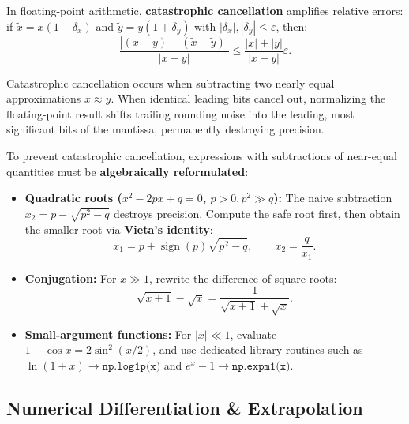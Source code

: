 \begin{theorem}
    In floating-point arithmetic, \textbf{catastrophic cancellation} amplifies relative errors: if $\tilde{x} = x(1 + \delta_x)$ and $\tilde{y} = y(1 + \delta_y)$ with $|\delta_x|, |\delta_y| \le \varepsilon$, then:
    \begin{equation}
        \frac{|(x - y) - (\tilde{x} - \tilde{y})|}{|x - y|} \le \frac{|x| + |y|}{|x - y|} \varepsilon.
    \end{equation}
\end{theorem}

Catastrophic cancellation occurs when subtracting two nearly equal approximations $x \approx y$. When identical leading bits cancel out, normalizing the floating-point result shifts trailing rounding noise into the leading, most significant bits of the mantissa, permanently destroying precision.

\begin{important}
    To prevent catastrophic cancellation, expressions with subtractions of near-equal quantities must be \textbf{algebraically reformulated}:
    \begin{itemize}
        \item \textbf{Quadratic roots ($x^2 - 2px + q = 0$, $p > 0, p^2 \gg q$):} The naive subtraction $x_2 = p - \sqrt{p^2 - q}$ destroys precision. Compute the safe root first, then obtain the smaller root via \textbf{Vieta's identity}:
        \begin{equation}
            x_1 = p + \operatorname{sign}(p)\sqrt{p^2 - q}, \qquad x_2 = \frac{q}{x_1}.
        \end{equation}
        \item \textbf{Conjugation:} For $x \gg 1$, rewrite the difference of square roots:
        \begin{equation}
            \sqrt{x+1} - \sqrt{x} = \frac{1}{\sqrt{x+1} + \sqrt{x}}.
        \end{equation}
        \item \textbf{Small-argument functions:} For $|x| \ll 1$, evaluate $1 - \cos x = 2\sin^2(x/2)$, and use dedicated library routines such as $\ln(1+x) \to \texttt{np.log1p(x)}$ and $e^x - 1 \to \texttt{np.expm1(x)}$.
    \end{itemize}
\end{important}

\subsection{Numerical Differentiation \& Extrapolation}

